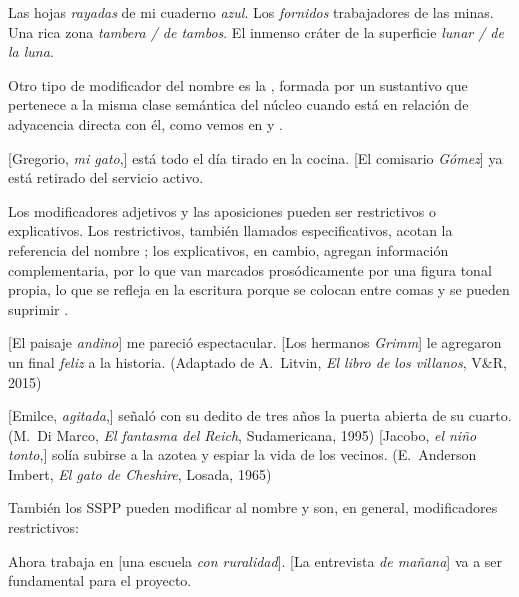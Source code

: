 \begin{exe}
  \ex\label{ex:05-hojas} Las hojas \textit{rayadas} de mi cuaderno \textit{azul}.
  \ex\label{ex:05-fornidos} Los \textit{fornidos} trabajadores de las minas.
  \ex\label{ex:05-tambera} Una rica zona \textit{tambera / de tambos}.
  \ex\label{ex:05-lunar} El inmenso cráter de la superficie \textit{lunar / de la
      luna}.
\end{exe}

Otro tipo de modificador del nombre es la , formada por un
sustantivo que pertenece a la misma clase semántica del núcleo cuando está en
relación de adyacencia directa con él, como vemos en  y
.

\begin{exe}
  \ex\label{ex:05-gregorio} {}[Gregorio, \textit{mi gato},] está todo el día
      tirado en la cocina.
  \ex\label{ex:05-gomez} {}[El comisario \textit{Gómez}] ya está retirado del
      servicio activo.
\end{exe}

\begin{recuadro}
Los modificadores adjetivos y las aposiciones pueden ser restrictivos o
explicativos. Los restrictivos, también llamados especificativos, acotan la
referencia del nombre ; los explicativos, en cambio, agregan
información complementaria, por lo que van marcados prosódicamente por una
figura tonal propia, lo que se refleja en la escritura porque se colocan entre
comas y se pueden suprimir .

\begin{exe}
  \ex\label{ex:05-andino}
    \begin{xlist}
      \ex {}[El paisaje \textit{andino}] me pareció espectacular.
      \ex {}[Los hermanos \textit{Grimm}] le agregaron un final \textit{feliz} a
          la historia. (Adaptado de A.~Litvin, \textit{El libro de los
          villanos}, V\&R, 2015)
    \end{xlist}
  \ex\label{ex:05-emilce}
    \begin{xlist}
      \ex {}[Emilce, \textit{agitada},] señaló con su dedito de tres años la
          puerta abierta de su cuarto. (M.~Di Marco, \textit{El fantasma del
          Reich}, Sudamericana, 1995)
      \ex {}[Jacobo, \textit{el niño tonto},] solía subirse a la azotea y espiar
          la vida de los vecinos. (E.~Anderson Imbert, \textit{El gato de
          Cheshire}, Losada, 1965)
    \end{xlist}
\end{exe}

También los SSPP pueden modificar al nombre y son, en general, modificadores
restrictivos:

\begin{exe}
  \ex
    \begin{xlist}
      \ex Ahora trabaja en [una escuela \textit{con ruralidad}].
      \ex {}[La entrevista \textit{de mañana}] va a ser fundamental para el
          proyecto.
    \end{xlist}
\end{exe}
\end{recuadro}

